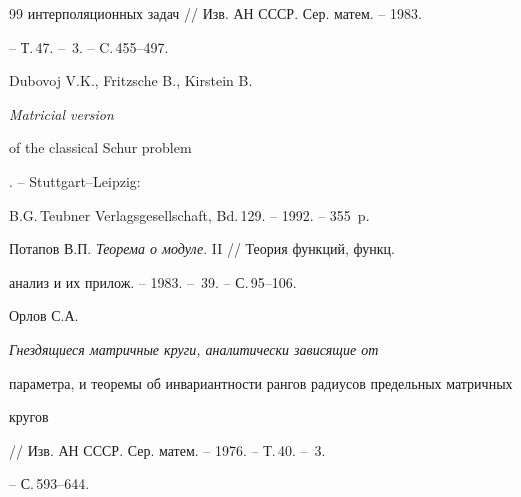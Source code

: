 \begin{thebibliography}{99}
{интерполяционных задач} // Изв. АН СССР. Сер. матем. -- 1983.


-- Т.\,47. -- \No\,3. -- C.\,455--497.




Dubovoj V.K., Fritzsche B., Kirstein B. {\em Matricial version


of the classical Schur problem}. -- Stuttgart--Leipzig: 


B.G.\,Teubner Verlagsgesellschaft, Bd.\,129. -- 1992. -- 355~p.




Потапов В.П. {\em Теорема о модуле}. II // Теория функций, функц.


анализ и их прилож. -- 1983. -- \No\,39. -- С.\,95--106.




Орлов С.А. {\em Гнездящиеся матричные круги, аналитически зависящие от


параметра, и теоремы об инвариантности рангов радиусов предельных матричных


кругов} // Изв. АН СССР. Сер. матем. -- 1976. -- Т.\,40. -- \No\,3.


-- С.\,593--644.





\end{thebibliography}





\vskip 1cm












\label{end}









